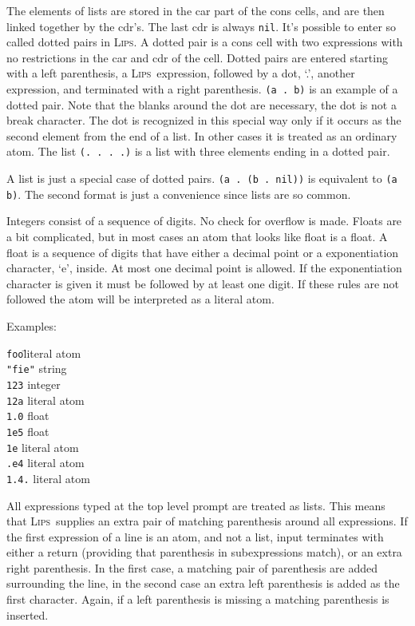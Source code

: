 \documentclass[a4paper]{article}
\newcommand{\lips}{\textsc{Lips}}
\newcommand{\lisp}[1]{\texttt{#1}}
\newcommand{\NIL}{\lisp{nil}}
\begin{document}
The elements of lists are stored in the car part of the cons cells,
and are then linked together by the cdr's.  The last cdr is always
\NIL.  It's possible to enter so called dotted pairs in \lips.  A
dotted pair is a cons cell with two expressions with no restrictions
in the car and cdr of the cell.  Dotted pairs are entered starting
with a left parenthesis, a \lips\ expression, followed by a dot, `.',
another expression, and terminated with a right parenthesis.
\lisp{(a\ .\ b)} is an example of a dotted pair. Note that the blanks
around the dot are necessary, the dot is not a break character.  The
dot is recognized in this special way only if it occurs as the second
element from the end of a list.  In other cases it is treated as an
ordinary atom.  The list \lisp{(.\ .\ .\ .)} is a list with three
elements ending in a dotted pair.

A list is just a special case of dotted pairs.  \lisp{(a .\ (b
  .\ nil))} is equivalent to \lisp{(a b)}.  The second format is just
a convenience since lists are so common.

Integers consist of a sequence of digits.  No check for overflow is
made.  Floats are a bit complicated, but in most cases an atom that
looks like float is a float.  A float is a sequence of digits that
have either a decimal point or a exponentiation character, `e',
inside.  At most one decimal point is allowed.  If the exponentiation
character is given it must be followed by at least one digit.  If
these rules are not followed the atom will be interpreted as a literal
atom.

Examples:
\begin{tabbing}
\lisp{foo}\hspace*{1cm}\=literal atom\\
\lisp{"fie"}      \>string\\
\lisp{123}        \>integer\\
\lisp{12a}        \>literal atom\\
\lisp{1.0}        \>float\\
\lisp{1e5}        \>float\\
\lisp{1e}         \>literal atom\\
\lisp{.e4}        \>literal atom\\
\lisp{1.4.}       \>literal atom
\end{tabbing}

All expressions typed at the top level prompt are treated as lists.
This means that \lips\ supplies an extra pair of matching parenthesis
around all expressions.  If the first expression of a line is an atom,
and not a list, input terminates with either a return (providing that
parenthesis in subexpressions match), or an extra right parenthesis.
In the first case, a matching pair of parenthesis are added
surrounding the line, in the second case an extra left parenthesis is
added as the first character.  Again, if a left parenthesis is missing
a matching parenthesis is inserted.
\end{document}
